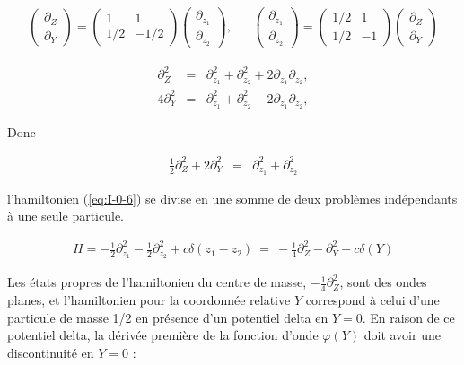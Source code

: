 {\begin{eqnarray*}
	\left ( \begin{array}{c} \partial_Z \\ \partial_Y \end{array} \right ) = \left ( \begin{array}{cc} 1 & 1  \\ 1/2 &  -1/2   \end{array} \right ) \left ( \begin{array}{c} \partial_{z_1} \\ \partial_{z_2} \end{array} \right ), & & \left ( \begin{array}{c} \partial_{z_1} \\ \partial_{z_2} \end{array} \right ) = \left ( \begin{array}{cc} 1/2 &  1  \\ 1/2 & - 1  \end{array} \right ) \left ( \begin{array}{c} \partial_Z \\ \partial_Y \end{array} \right )		
\end{eqnarray*}

\begin{eqnarray*}
	\partial_Z^2 & = & 	\partial_{z_1}^2 + \partial_{z_2}^2 + 2 \partial_{z_1} \partial_{z_2},\\
	4\partial_Y^2 & = & 	\partial_{z_1}^2 + \partial_{z_2}^2 - 2 \partial_{z_1} \partial_{z_2},
\end{eqnarray*}

Donc 

\begin{eqnarray*}
	\frac{1}{2} \partial_Z^2 + 	2\partial_Y^2 & = & \partial_{z_1}^2 + \partial_{z_2}^2
\end{eqnarray*}
}

l'hamiltonien (\ref{eq:I-0-6}) se divise en une somme de deux problèmes indépendants à une seule particule.

\begin{eqnarray}\label{eq:I-1-8}
	H = -\frac{1}2 \partial_{z_1}^2   -\frac{1}2 \partial_{z_2}^2 + c \delta ( z_1 - z_2 )  ~= ~	-\frac{1}{4} \partial_Z^2 - 	\partial_Y^2 + c \delta ( Y ) 
\end{eqnarray}

Les états propres de l'hamiltonien du centre de masse, $-\frac{1}{4} \partial_Z^2$, sont des ondes planes, et l'hamiltonien pour la coordonnée relative $Y$ correspond à celui d'une particule de masse 1/2 en présence d'un potentiel delta en $Y = 0$. En raison de ce potentiel delta, la dérivée première de la fonction d'onde $\varphi(Y)$ doit avoir une discontinuité en $Y = 0$ : 

